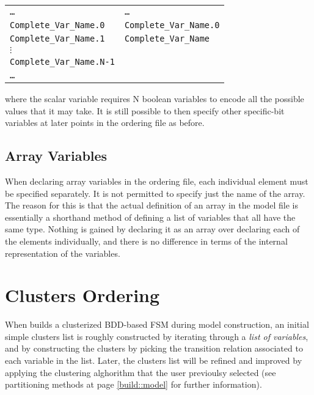 \begin{small}
\begin{tabular}{ll} \texttt{\ldots} &
\texttt{\ldots}\\ \texttt{Complete\_Var\_Name.0} &
\texttt{Complete\_Var\_Name.0}\\ \texttt{Complete\_Var\_Name.1} &
\texttt{Complete\_Var\_Name}\\ \texttt{$\vdots$} & \raisebox{1ex}{\texttt{\ldots}}\\
\texttt{Complete\_Var\_Name.N-1}\\ \texttt{\ldots} &
\end{tabular}
\end{small}

\noindent where the scalar variable 
requires N boolean variables to encode all the possible values that it
may take.
%
It is still possible to then specify other specific-bit variables at
later points in the ordering file as before.\\

\subsection{Array Variables}
\label{Array Variables}

When declaring array variables in the ordering file, each individual
element must be specified separately.
%
It is not permitted to specify just the name of the array.
%
The reason for this is that the actual definition of an array in the
model file is essentially a shorthand method of defining a list of
variables that all have the same type.
%
Nothing is gained by declaring it as an array over declaring each of
the elements individually, and there is no difference in terms of the
internal representation of the variables.


\section{Clusters Ordering}
%
When \nusmv builds a clusterized BDD-based FSM during model
construction, an initial simple clusters list is roughly constructed
by iterating through a \emph{list of variables}, and by constructing
the clusters by picking the transition relation associated to each
variable in the list. Later, the clusters list will be refined and
improved by applying the clustering alghorithm that the user
previoulsy selected (see partitioning methods at page
\ref{build::model} for further information).



